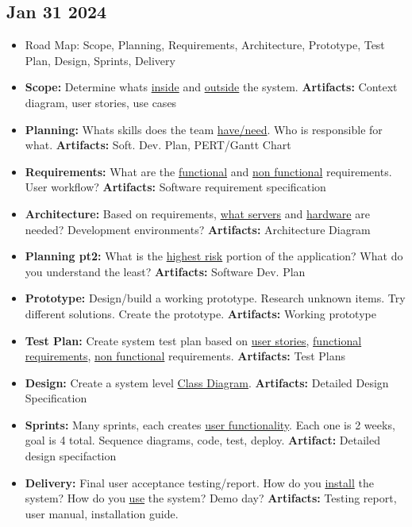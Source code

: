 \documentclass[12pt]{article}
\begin{document}
\subsection{Jan 31 2024}

\begin{itemize}
		  \item Road Map: Scope, Planning, Requirements, Architecture, Prototype, Test Plan, Design, Sprints, Delivery
		  \item \textbf{Scope:} Determine whats \underline{inside} and \underline{outside} the system. 
					 \textbf{Artifacts:} Context diagram, user stories, use cases
		  \item \textbf{Planning:} Whats skills does the team \underline{have/need}. Who is responsible for what. 
					 \textbf{Artifacts:} Soft. Dev. Plan, PERT/Gantt Chart
		  \item \textbf{Requirements:} What are the \underline{functional} and \underline{non functional} 
					 requirements. User workflow? \textbf{Artifacts:} Software requirement specification
		  \item \textbf{Architecture:} Based on requirements, \underline{what servers} and \underline{hardware} are needed? 
					 Development environments? \textbf{Artifacts:} Architecture Diagram
		  \item \textbf{Planning pt2:} What is the \underline{highest risk} portion of the application? What do you understand
					 the least? \textbf{Artifacts:} Software Dev. Plan
		  \item \textbf{Prototype:} Design/build a working prototype. Research unknown items. Try different solutions. 
					 Create the prototype. \textbf{Artifacts:} Working prototype
		  \item \textbf{Test Plan:} Create system test plan based on \underline{user stories},
					 \underline{functional requirements}, \underline{non functional}
					 requirements. \textbf{Artifacts:} Test Plans
		  \item \textbf{Design:} Create a system level \underline{Class Diagram}. \textbf{Artifacts:} 
					 Detailed Design Specification
		  \item \textbf{Sprints:} Many sprints, each creates \underline{user functionality}. Each one is 2 weeks, goal is 4 total.
					 Sequence diagrams, code, test, deploy. \textbf{Artifact:} Detailed design specifaction
		  \item \textbf{Delivery:} Final user acceptance testing/report. How do you \underline{install} the system?
					 How do you \underline{use} the system? Demo day? \textbf{Artifacts:} Testing report, user manual, installation
					 guide.
\end{itemize}
\end{document}
